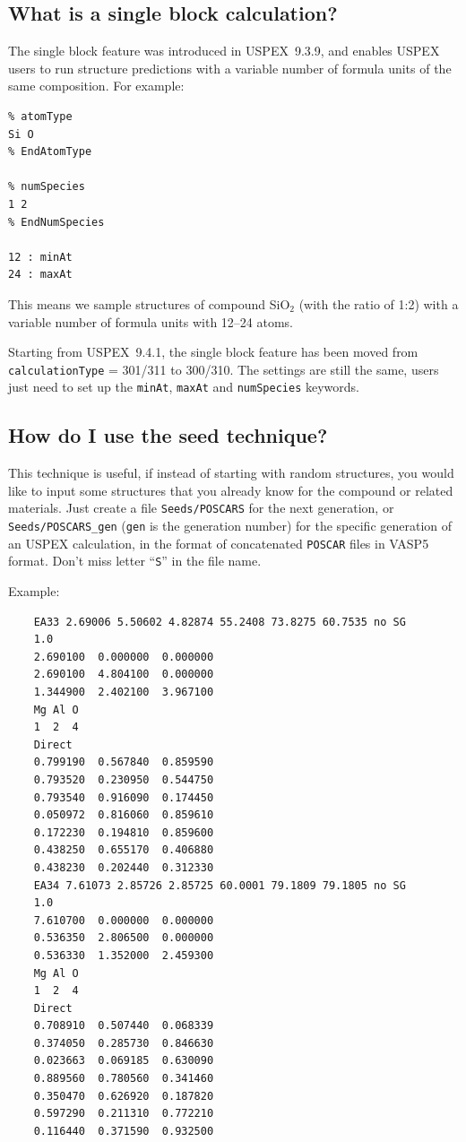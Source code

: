 \documentclass[12pt]{article}
\newcommand{\keyword}[1]{\texttt{#1}}
\newcommand{\file}[1]{\texttt{#1}}
\begin{document}
\subsection{What is a single block calculation?} \label{faq_single_block}
The single block feature was introduced in USPEX~9.3.9, and enables USPEX users
to run structure predictions with a variable number of formula units 
of the same composition. For example:

{\footnotesize
\begin{verbatim}
% atomType
Si O
% EndAtomType

% numSpecies
1 2
% EndNumSpecies

12 : minAt
24 : maxAt
\end{verbatim}
}

This means we sample structures of compound SiO$_2$ (with the ratio of 1:2)
with a variable number of formula units with 12--24 atoms.

Starting from USPEX~9.4.1, the single block feature has been moved from
\keyword{calculationType} = 301/311 to 300/310. The settings are still the same,
users just need to set up the \keyword{minAt}, \keyword{maxAt} and
\keyword{numSpecies} keywords.


\subsection{How do I use the seed technique?} \label{faq_seeds}
This technique is useful, if instead of starting with random structures, you
would like to input some structures that you already know for the compound or
related materials. Just create a file \file{Seeds/POSCARS} for the next
generation, or \file{Seeds/POSCARS\_gen} (\texttt{gen} is the generation number)
for the specific generation of an USPEX calculation, in the format of
concatenated \file{POSCAR} files in VASP5 format. Don't miss letter
``\texttt{S}'' in the file name.

Example:

{\footnotesize
\begin{verbatim}
    EA33 2.69006 5.50602 4.82874 55.2408 73.8275 60.7535 no SG
    1.0
    2.690100  0.000000  0.000000
    2.690100  4.804100  0.000000
    1.344900  2.402100  3.967100
    Mg Al O
    1  2  4
    Direct
    0.799190  0.567840  0.859590
    0.793520  0.230950  0.544750
    0.793540  0.916090  0.174450
    0.050972  0.816060  0.859610
    0.172230  0.194810  0.859600
    0.438250  0.655170  0.406880
    0.438230  0.202440  0.312330
    EA34 7.61073 2.85726 2.85725 60.0001 79.1809 79.1805 no SG
    1.0
    7.610700  0.000000  0.000000
    0.536350  2.806500  0.000000
    0.536330  1.352000  2.459300
    Mg Al O
    1  2  4
    Direct
    0.708910  0.507440  0.068339
    0.374050  0.285730  0.846630
    0.023663  0.069185  0.630090
    0.889560  0.780560  0.341460
    0.350470  0.626920  0.187820
    0.597290  0.211310  0.772210
    0.116440  0.371590  0.932500
\end{verbatim}
}
\end{document}
